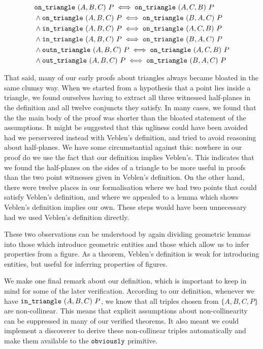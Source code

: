\begin{equation}\label{eq:triSyms}
  \begin{split}
&    \code{on\_triangle}\ (A,B,C)\ P \iff \code{on\_triangle}\ (A,C,B)\ P\\
&    \wedge \code{on\_triangle}\ (A,B,C)\ P \iff \code{on\_triangle}\ (B,A,C)\ P\\
&    \wedge \code{in\_triangle}\ (A,B,C)\ P \iff \code{on\_triangle}\ (A,C,B)\ P\\
&    \wedge \code{in\_triangle}\ (A,B,C)\ P \iff \code{on\_triangle}\ (B,A,C)\ P\\
&    \wedge \code{outn\_triangle}\ (A,B,C)\ P \iff \code{on\_triangle}\ (A,C,B)\ P\\
&    \wedge \code{out\_triangle}\ (A,B,C)\ P \iff \code{on\_triangle}\ (B,A,C)\ P
  \end{split}
\end{equation}

That said, many of our early proofs about triangles always became bloated in the same clumsy way. When we started from a hypothesis that a point lies inside a triangle, we found ourselves having to extract all three witnessed half-planes in the definition and all twelve conjuncts they satisfy. In many cases, we found that the the main body of the proof was shorter than the bloated statement of the assumptions. It might be suggested that this ugliness could have been avoided had we perservered instead with Veblen's definition, and tried to avoid reasoning about half-planes. We have some circumstantial against this: nowhere in our proof do we use the fact that our definition implies Veblen's. This indicates that we found the half-planes on the sides of a triangle to be more useful in proofs than the two point witnesses given in Veblen's definition. On the other hand, there were twelve places in our formalisation where we had two points that could satisfy Veblen's definition, and where we appealed to a lemma which shows Veblen's definition implies our own. These steps would have been unnecessary had we used Veblen's definition directly. 

These two observations can be understood by again dividing geometric lemmas into those which introduce geometric entities and those which allow us to infer properties from a figure. As a theorem, Veblen's definition is weak for introducing entities, but useful for inferring properties of figures.

We make one final remark about our definition, which is important to keep in mind for some of the later verification. According to our definition, whenever we have $\texttt{in\_triangle}\ (A,B,C)\ P$, we know that all triples chosen from $\{A,B,C,P\}$ are non-collinear. This means that explicit assumptions about non-collinearity can be suppressed in many of our verified theorems. It also meant we could implement a discoverer  to derive these non-collinear triples automatically and make them available to the $\texttt{obviously}$ primitive. 

